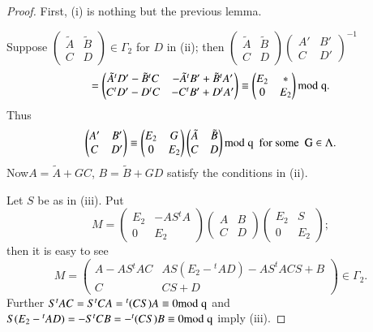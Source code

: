 \begin{proof}
First, (i) is nothing but the previous lemma.

Suppose $\left(\begin{smallmatrix} \tilde{A} & \tilde{B}\\ C &
  D
\end{smallmatrix}\right)\in\Gamma_{2}$ for $D$ in (ii); then
$\left(\begin{smallmatrix} \tilde{A} & \tilde{B}\\ C & D
\end{smallmatrix}\right)\left(\begin{smallmatrix} A' & B'\\ C & D'
\end{smallmatrix}\right)^{-1}$
$$
=
\begin{pmatrix}
\tilde{A}{}^{t}D'-\tilde{B}{}^{t}C &
-\tilde{A}{}^{t}B'+\tilde{B}{}^{t}A'\\
C{}^{t}D'-D{}^{t}C & -C{}^{t}B'+D{}^{t}A'
\end{pmatrix}
\equiv
\begin{pmatrix}
E_{2} & \ast\\
0 & E_{2}
\end{pmatrix}
\rm{mod} \; q.
$$
Thus
$$
\begin{pmatrix}
A' & B'\\
C & D'
\end{pmatrix}
\equiv 
\begin{pmatrix}
E_{2} & G\\
0 & E_{2}
\end{pmatrix}
\begin{pmatrix}
\tilde{A} & \tilde{B}\\
C & D
\end{pmatrix}
\rm{mod} \; q\text{ \ for some \ } G\in \Lambda.
$$
Now\pageoriginale $A=\tilde{A}+GC$, $B=\tilde{B}+GD$ satisfy
the conditions in (ii).

Let $S$ be as in (iii). Put
$$
M=
\begin{pmatrix}
E_{2} & -AS{}^{t}A\\
0 & E_{2}
\end{pmatrix}
\begin{pmatrix}
A & B\\
C & D
\end{pmatrix}
\begin{pmatrix}
E_{2} & S\\
0 & E_{2}
\end{pmatrix}
;
$$
then it is easy to see
$$
M=
\begin{pmatrix}
A-AS{}^{t}AC & AS(E_{2}-{}^{t}AD)-AS^{t}ACS+B\\
C & CS+D
\end{pmatrix}
\in \Gamma_{2}.
$$
Further $S{}^{t}AC=S{}^{t}CA={}^{t}(CS)A\equiv 0\rm{mod} \; q$ and
$S(E_{2}-{}^{t}AD)=-S{}^{t}CB=-{}^{t}(CS)B\equiv 0\rm{mod} \; q$ imply
(iii). 
\end{proof}


